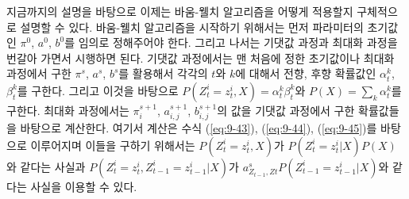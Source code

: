 \documentclass[a4paper]{oblivoir}
\begin{document}
지금까지의 설명을 바탕으로 이제는 바움-웰치 알고리즘을 어떻게 적용할지 구체적으로 설명할 수 있다. 바움-웰치 알고리즘을 시작하기 위해서는 먼저 파라미터의 초기값인 $\pi^{0}$, $a^{0}$, $b^{0}$를 임의로 정해주어야 한다. 그리고 나서는 기댓값 과정과 최대화 과정을 번갈아 가면서 시행하면 된다. 기댓값 과정에서는 맨 처음에 정한 초기값이나 최대화 과정에서 구한 $\pi^{s}$, $a^{s}$, $b^{s}$를 활용해서 각각의 $t$와 $k$에 대해서 전향, 후향 확률값인 $\alpha_{t}^{k}$, $\beta_{t}^{k}$를 구한다. 그리고 이것을 바탕으로 $P(Z_{t}^{i}=z_{t}^{i},X)=\alpha_{t}^{k}\beta_{t}^{k}$와 $P(X)=\sum_{k} \alpha_{t}^{k}$를 구한다. 최대화 과정에서는 $\pi_{i}^{s+1}$, $a_{i,j}^{s+1}$, $b_{i,j}^{s+1}$의 값을 기댓값 과정에서 구한 확률값들을 바탕으로 계산한다. 여기서 계산은 수식 (\ref{eq:9-43}), (\ref{eq:9-44}), (\ref{eq:9-45})를 바탕으로 이루어지며 이들을 구하기 위해서는 $P(Z_{t}^{i}=z_{t}^{i},X)$가 $P(Z_{t}^{i}=z_{t}^{i}|X)P(X)$와 같다는 사실과 $P(Z_{t}^{i}=z_{t}^{i}, Z_{t-1}^{i}=z_{t-1}^{i} | X)$가 $a_{Z_{t-1},Z{t}}^{s} P(Z_{t-1}^{i}=z_{t-1}^{i}| X)$와 같다는 사실을 이용할 수 있다.  
\end{document}
